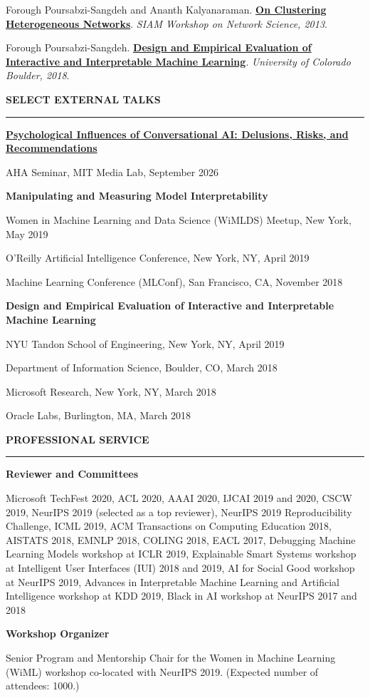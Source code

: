 \documentclass[11pt,letterpaper]{article}
\newcommand{\cvsection}[1]{%
  \Needspace{8\baselineskip}%
  \vspace{1.25em}%
  {\large\bfseries\color{navy}\MakeUppercase{#1}}\par
  \vspace{0.16em}%
  {\color{accentblue}\rule{\textwidth}{1.1pt}}\par
  \vspace{0.55em}%
}
\newcommand{\publication}[3]{%
  \Needspace{5\baselineskip}%
  \begingroup
  \setlength{\parindent}{0pt}%
  \setlength{\hangindent}{1.1em}%
  \setlength{\hangafter}{1}%
  #1. \textbf{#2}. \emph{#3}.\par
  \endgroup
  \vspace{0.7em}%
}
\begin{document}
\publication{Forough Poursabzi-Sangdeh and Ananth Kalyanaraman}
{\href{http://www.eecs.wsu.edu/~ananth/papers/Poursabzi_SIAMNetworkScience13_preprint.pdf}{On Clustering Heterogeneous Networks}}
{SIAM Workshop on Network Science, 2013}

\publication{Forough Poursabzi-Sangdeh}
{\href{https://scholar.colorado.edu/csci_gradetds/163/}{Design and Empirical Evaluation of Interactive and Interpretable Machine Learning}}
{University of Colorado Boulder, 2018}

\cvsection{Select External Talks}

\textbf{\color{navy}\href{https://www.youtube.com/watch?v=98mHmuwzkFc}{Psychological Influences of Conversational AI: Delusions, Risks, and Recommendations}}\par
AHA Seminar, MIT Media Lab, September 2026\par
\vspace{0.7em}
\textbf{\color{navy}Manipulating and Measuring Model Interpretability}\par
Women in Machine Learning and Data Science (WiMLDS) Meetup, New York, May 2019\par
O'Reilly Artificial Intelligence Conference, New York, NY, April 2019\par
Machine Learning Conference (MLConf), San Francisco, CA, November 2018\par
\vspace{0.7em}
\textbf{\color{navy}Design and Empirical Evaluation of Interactive and Interpretable Machine Learning}\par
NYU Tandon School of Engineering, New York, NY, April 2019\par
Department of Information Science, Boulder, CO, March 2018\par
Microsoft Research, New York, NY, March 2018\par
Oracle Labs, Burlington, MA, March 2018

\iffalse
\newpage

\cvsection{Professional Service}

\textbf{\color{navy}Reviewer and Committees}\par
Microsoft TechFest 2020, ACL 2020, AAAI 2020, IJCAI 2019 and 2020, CSCW 2019, NeurIPS 2019 (selected as a top reviewer), NeurIPS 2019 Reproducibility Challenge, ICML 2019, ACM Transactions on Computing Education 2018, AISTATS 2018, EMNLP 2018, COLING 2018, EACL 2017, Debugging Machine Learning Models workshop at ICLR 2019, Explainable Smart Systems workshop at Intelligent User Interfaces (IUI) 2018 and 2019, AI for Social Good workshop at NeurIPS 2019, Advances in Interpretable Machine Learning and Artificial Intelligence workshop at KDD 2019, Black in AI workshop at NeurIPS 2017 and 2018\par
\vspace{0.7em}
\textbf{\color{navy}Workshop Organizer}\par
Senior Program and Mentorship Chair for the Women in Machine Learning (WiML) workshop co-located with NeurIPS 2019. (Expected number of attendees: 1000.)
\end{document}

